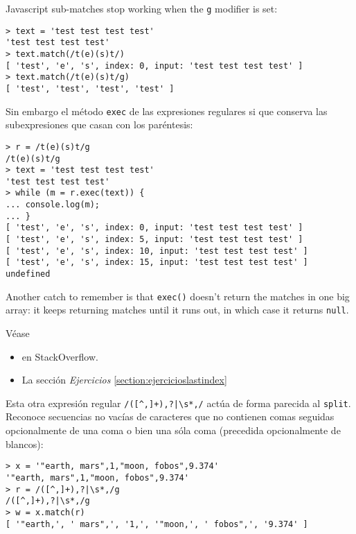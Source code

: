 Javascript sub-matches stop working when the \verb|g| modifier is set:
\begin{verbatim}
> text = 'test test test test'
'test test test test'
> text.match(/t(e)(s)t/)
[ 'test', 'e', 's', index: 0, input: 'test test test test' ]
> text.match(/t(e)(s)t/g)
[ 'test', 'test', 'test', 'test' ] 
\end{verbatim}
Sin embargo el método \verb|exec| de las expresiones regulares si que 
conserva las subexpresiones que casan con los paréntesis:
\begin{verbatim}
> r = /t(e)(s)t/g
/t(e)(s)t/g
> text = 'test test test test'
'test test test test'
> while (m = r.exec(text)) {
... console.log(m);
... }
[ 'test', 'e', 's', index: 0, input: 'test test test test' ]
[ 'test', 'e', 's', index: 5, input: 'test test test test' ]
[ 'test', 'e', 's', index: 10, input: 'test test test test' ]
[ 'test', 'e', 's', index: 15, input: 'test test test test' ]
undefined
\end{verbatim}
Another catch to remember is that \verb|exec()| doesn't return the matches in
one big array: it keeps returning matches until it runs out, in which
case it returns \verb|null|.

Véase
\begin{itemize}
\item
{}
en StackOverflow.
\item
La sección 
{\it Ejercicios}
\ref{section:ejercicioslastindex}
\end{itemize}

Esta otra expresión regular \verb#/([^,]+),?|\s*,/# actúa de forma parecida al \verb|split|. 
Reconoce secuencias no vacías de caracteres que no contienen comas seguidas opcionalmente
de una coma o bien una sóla coma (precedida opcionalmente de blancos):
\begin{verbatim}
> x = '"earth, mars",1,"moon, fobos",9.374'
'"earth, mars",1,"moon, fobos",9.374'
> r = /([^,]+),?|\s*,/g
/([^,]+),?|\s*,/g
> w = x.match(r)
[ '"earth,', ' mars",', '1,', '"moon,', ' fobos",', '9.374' ]
\end{verbatim}

